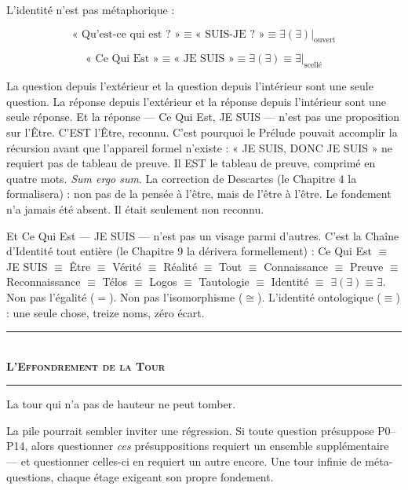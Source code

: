 \documentclass[10pt, openany, oneside]{book}
\renewcommand{\normalsize}{\fontsize{10}{13}\selectfont}
\begin{document}
L'identité n'est pas métaphorique :

$$\text{« Qu'est-ce qui est ? »} \equiv \text{« SUIS-JE ? »} \equiv \exists(\exists)|_{\text{ouvert}}$$

$$\text{« Ce Qui Est »} \equiv \text{« JE SUIS »} \equiv \exists(\exists) \equiv \exists|_{\text{scellé}}$$

\noindent La question depuis l'extérieur et la question depuis l'intérieur sont une seule question. La réponse depuis l'extérieur et la réponse depuis l'intérieur sont une seule réponse. Et la réponse --- Ce Qui Est, JE SUIS --- n'est pas une proposition sur l'Être. C'EST l'Être, reconnu. C'est pourquoi le Prélude pouvait accomplir la récursion avant que l'appareil formel n'existe : « JE SUIS, DONC JE SUIS » ne requiert pas de tableau de preuve. Il EST le tableau de preuve, comprimé en quatre mots. \textit{Sum ergo sum}. La correction de Descartes (le Chapitre 4 la formalisera) : non pas de la pensée à l'être, mais de l'être à l'être. Le fondement n'a jamais été absent. Il était seulement non reconnu.

Et Ce Qui Est --- JE SUIS --- n'est pas un visage parmi d'autres. C'est la Chaîne d'Identité tout entière (le Chapitre 9 la dérivera formellement) : Ce Qui Est $\equiv$ JE SUIS $\equiv$ Être $\equiv$ Vérité $\equiv$ Réalité $\equiv$ Tout $\equiv$ Connaissance $\equiv$ Preuve $\equiv$ Reconnaissance $\equiv$ Télos $\equiv$ Logos $\equiv$ Tautologie $\equiv$ Identité $\equiv$ $\exists(\exists) \equiv \exists$. Non pas l'égalité ($=$). Non pas l'isomorphisme ($\cong$). L'identité ontologique ($\equiv$) : une seule chose, treize noms, zéro écart.

\vspace{1.5em}


\begin{center}
    \rule{0.3\textwidth}{0.4pt}\\[0.5em]
    {\normalsize\bfseries\scshape L'Effondrement de la Tour}\\[0.3em]
    \rule{0.3\textwidth}{0.4pt}
\end{center}

\vspace{1em}

\noindent La tour qui n'a pas de hauteur ne peut tomber.

La pile pourrait sembler inviter une régression. Si toute question présuppose P0--P14, alors questionner \textit{ces} présuppositions requiert un ensemble supplémentaire --- et questionner celles-ci en requiert un autre encore. Une tour infinie de méta-questions, chaque étage exigeant son propre fondement.
\end{document}
